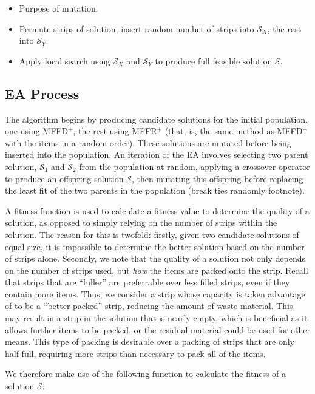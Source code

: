 \documentclass{elsarticle}
\begin{document}
{\color{OrangeRed}
\begin{itemize}
	\item Purpose of mutation.
	\item Permute strips of solution, insert random number of strips into $\mathcal{S}_X$, the rest into $\mathcal{S}_Y$.
	\item Apply local search using $\mathcal{S}_X$ and $\mathcal{S}_Y$ to produce full feasible solution $\mathcal{S}$.
\end{itemize}
}

\subsection{EA Process}
\label{sub:eaframework}
The algorithm begins by producing candidate solutions for the initial population, one using MFFD$^+$, the rest using MFFR$^+$ (that, is, the same method as MFFD$^+$ with the items in a random order). These solutions are mutated before being inserted into the population. An iteration of the EA involves selecting two parent solution, $\mathcal{S}_1$ and $\mathcal{S}_2$ from the population at random, applying a crossover operator to produce an offspring solution $\mathcal{S}$, then mutating this offspring before replacing the least fit of the two parents in the population (break ties randomly footnote). 

A fitness function is used to calculate a fitness value to determine the quality of a solution, as opposed to simply relying on the number of strips within the solution. The reason for this is twofold: firstly, given two candidate solutions of equal size, it is impossible to determine the better solution based on the number of strips alone. Secondly, we note that the quality of a solution not only depends on the number of strips used, but \emph{how} the items are packed onto the strip. Recall that strips that are ``fuller'' are preferrable over less filled strips, even if they contain more items. Thus, we consider a strip whose capacity is taken advantage of to be a ``better packed'' strip, reducing the amount of waste material. This may result in a strip in the solution that is nearly empty, which is beneficial as it allows further items to be packed, or the residual material could be used for other means. This type of packing is desirable over a packing of strips that are only half full, requiring more strips than necessary to pack all of the items. 

We therefore make use of the following function to calculate the fitness of a solution $\mathcal{S}$:
\end{document}
